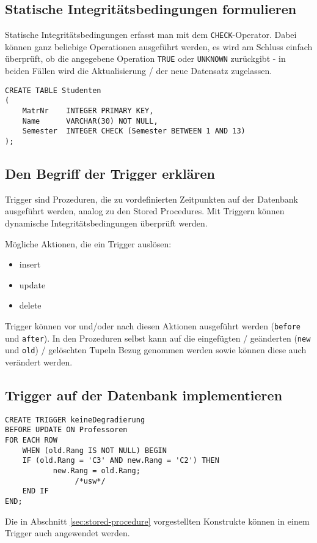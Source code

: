 \subsection{Statische Integritätsbedingungen formulieren}
Statische Integritätsbedingungen erfasst man mit dem \texttt{CHECK}-Operator. Dabei können ganz beliebige Operationen ausgeführt werden, es wird am Schluss einfach überprüft, ob die angegebene Operation \texttt{TRUE} oder \texttt{UNKNOWN} zurückgibt - in beiden Fällen wird die Aktualisierung / der neue Datensatz zugelassen.

\begin{lstlisting}[caption={Beispiel mit CHECK}]
CREATE TABLE Studenten
(
    MatrNr    INTEGER PRIMARY KEY,
    Name      VARCHAR(30) NOT NULL,
    Semester  INTEGER CHECK (Semester BETWEEN 1 AND 13)
);
\end{lstlisting}

\subsection{Den Begriff der Trigger erklären}
Trigger sind Prozeduren, die zu vordefinierten Zeitpunkten auf der Datenbank ausgeführt werden, analog zu den Stored Procedures. Mit Triggern können dynamische Integritätsbedingungen überprüft werden.

Mögliche Aktionen, die ein Trigger auslösen:

\begin{itemize}
  \item insert
  \item update
  \item delete
\end{itemize}

Trigger können vor und/oder nach diesen Aktionen ausgeführt werden (\texttt{before} und \texttt{after}). In den Prozeduren selbst kann auf die eingefügten / geänderten (\texttt{new} und \texttt{old}) / gelöschten Tupeln Bezug genommen werden sowie können diese auch verändert werden.

\subsection{Trigger auf der Datenbank implementieren}

\begin{lstlisting}[caption={Trigger Beispiel SQL}]
CREATE TRIGGER keineDegradierung
BEFORE UPDATE ON Professoren
FOR EACH ROW
    WHEN (old.Rang IS NOT NULL) BEGIN
    IF (old.Rang = 'C3' AND new.Rang = 'C2') THEN
           new.Rang = old.Rang;
                /*usw*/
    END IF
END;
\end{lstlisting}

Die in Abschnitt \ref{sec:stored-procedure} vorgestellten Konstrukte können in einem Trigger auch angewendet werden.
